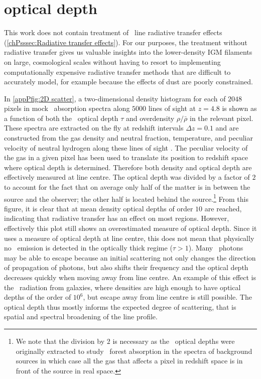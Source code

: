 \section{\texorpdfstring{\lya}{\lyatext} optical depth}
\label{appPsec:Lya optical depth}

This work does not contain treatment of \lya\ line radiative transfer effects (\cref{chPsssec:Radiative transfer effects}). For our purposes, the treatment without radiative transfer gives us valuable insights into the lower-density IGM filaments on large, cosmological scales without having to resort to implementing computationally expensive radiative transfer methods that are difficult to accurately model, for example because the effects of dust are poorly constrained.

In \cref{appPfig:2D scatter}, a two-dimensional density histogram for each of $2048$ pixels in mock \lya\ absorption spectra along $5000$ lines of sight at $z=4.8$ is shown as a function of both the \lya\ optical depth $\tau$ and overdensity $\rho/\bar{\rho}$ in the relevant pixel. These spectra are extracted on the fly at redshift intervals $\Delta z = 0.1$ and are constructed from the gas density and neutral fraction, temperature, and peculiar velocity of neutral hydrogen along these lines of sight \citep[for details, see][ where they are studied in the context of the \lya\ forest]{2017MNRAS.464..897B}. The peculiar velocity of the gas in a given pixel has been used to translate its position to redshift space where optical depth is determined. Therefore both density and optical depth are effectively measured at line centre. The optical depth was divided by a factor of $2$ to account for the fact that on average only half of the matter is in between the source and the observer; the other half is located behind the source.\footnote{We note that the division by $2$ is necessary as the \lya\ optical depths were originally extracted to study \lya\ forest absorption in the spectra of background sources in which case all the gas that affects a pixel in redshift space is in front of the source in real space.} From this figure, it is clear that at mean density optical depths of order $10$ are reached, indicating that radiative transfer has an effect on most regions. However, effectively this plot still shows an overestimated measure of optical depth. Since it uses a measure of optical depth at line centre, this does not mean that physically no \lya\ emission is detected in the optically thick regime ($\tau > 1$). Many \lya\ photons may be able to escape because an initial scattering not only changes the direction of propagation of photons, but also shifts their frequency and the optical depth decreases quickly when moving away from line centre. An example of this effect is the \lya\ radiation from galaxies, where densities are high enough to have optical depths of the order of $10^6$, but escape away from line centre is still possible. The optical depth thus mostly informs the expected degree of scattering, that is spatial and spectral broadening of the line profile.


